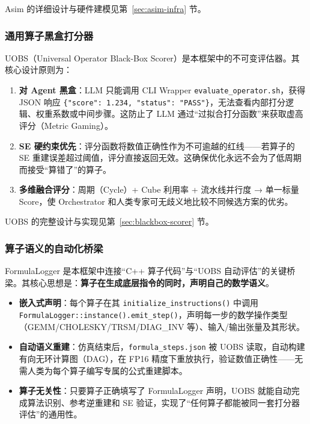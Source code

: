 \documentclass{CjC}
\begin{document}
    Asim 的详细设计与硬件建模见第~\ref{sec:asim-infra} 节。

    \subsubsection{通用算子黑盒打分器}

    UOBS（Universal Operator Black-Box
    Scorer）是本框架中的不可变评估器。其核心设计原则为：

    \begin{enumerate}
        \item \textbf{对 Agent 黑盒}：LLM 只能调用 CLI Wrapper \texttt{evaluate\_operator.sh}，获得
            JSON 响应 \texttt{\{"score": 1.234, "status": "PASS"\}}，无法查看内部打分逻辑、权重系数或中间步骤。这防止了
            LLM 通过“过拟合打分函数”来获取虚高评分（Metric Gaming）。

        \item \textbf{SE 硬约束优先}：评分函数将数值正确性作为不可逾越的红线——若算子的
            SE 重建误差超过阈值，评分直接返回无效。这确保优化永远不会为了低周期而接受“算错了”的算子。

        \item \textbf{多维融合评分}：周期（Cycle）+ Cube 利用率 + 流水线并行度 →
            单一标量 Score，使 Orchestrator
            和人类专家可无歧义地比较不同候选方案的优劣。
    \end{enumerate}

    UOBS 的完整设计与实现见第~\ref{sec:blackbox-scorer} 节。

    \subsubsection{算子语义的自动化桥梁}

    FormulaLogger 是本框架中连接“C++ 算子代码”与“UOBS
    自动评估”的关键桥梁。其核心思想是：\textbf{算子在生成底层指令的同时，声明自己的数学语义}。

    \begin{itemize}
        \item \textbf{嵌入式声明}：每个算子在其 \texttt{initialize\_instructions()}
            中调用 \texttt{FormulaLogger::instance().emit\_step()}，声明每一步的数学操作类型（GEMM/CHOLESKY/TRSM/DIAG\_INV
            等）、输入/输出张量及其形状。

        \item \textbf{自动语义重建}：仿真结束后，\texttt{formula\_steps.json} 被
            UOBS 读取，自动构建有向无环计算图（DAG），在 FP16 精度下重放执行，验证数值正确性——无需人类为每个算子编写专属的公式重建脚本。

        \item \textbf{算子无关性}：只要算子正确填写了 FormulaLogger 声明，UOBS 就能自动完成算法识别、参考逆重建和
            SE 验证，实现了“任何算子都能被同一套打分器评估”的通用性。
    \end{itemize}
\end{document}
